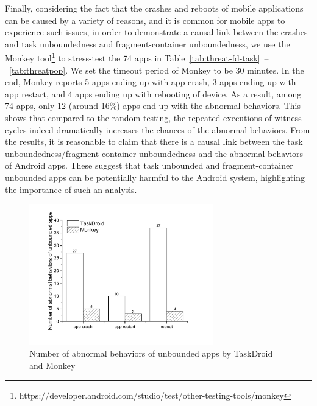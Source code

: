 Finally, considering the fact that the crashes and reboots of mobile applications can be caused by a variety of reasons, and it is common for mobile apps to experience such issues, in order to demonstrate a causal link between the crashes and task unboundedness and fragment-container unboundedness, we use the Monkey tool\footnote{https://developer.android.com/studio/test/other-testing-tools/monkey} to stress-test the 74 apps in Table~\ref{tab:threat-fd-task}~--~\ref{tab:threatpop}. We set the timeout period of Monkey to be 30 minutes. In the end, Monkey reports 5 apps ending up with app crash, 3 apps ending up with app restart, and 4 apps ending up with rebooting of device. As a result, among 74 apps, only 12 (around 16\%) apps end up with the abnormal behaviors.  This shows that compared to the random testing, the repeated executions of witness cycles indeed dramatically increases the chances of the abnormal behaviors. From the results, it is reasonable to claim that there is a causal link between the task unboundedness/fragment-container unboundedness and the abnormal behaviors of Android apps. These suggest that task unbounded and fragment-container unbounded apps can be potentially harmful to
the Android system, highlighting the importance of such an analysis.


\begin{figure}[htbp]
	\centering
	\centering
	\includegraphics[width=8cm]{cmp-monkey.pdf}
	\caption{Number of abnormal behaviors of unbounded apps by TaskDroid and Monkey}
	\label{fig:cmp-monkey}
\end{figure}


